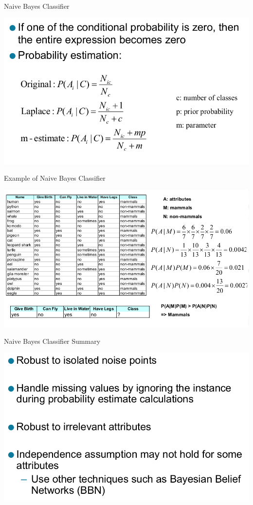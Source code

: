 \documentclass{beamer}
\begin{document}
\begin{frame}{Naive Bayes Classifier}
    \begin{center}
        \includegraphics[scale=0.4]{bayesClassifier10.png}
    \end{center}
\end{frame}
\begin{frame}{Example of Naive Bayes Classifier}
    \begin{center}
        \includegraphics[scale=0.36]{bayesClassifier11.png}
    \end{center}
\end{frame}
\begin{frame}{Naive Bayes Classifier Summary}
    \begin{center}
        \includegraphics[scale=0.32]{bayesClassifier12.png}
    \end{center}
\end{frame}
\end{document}
